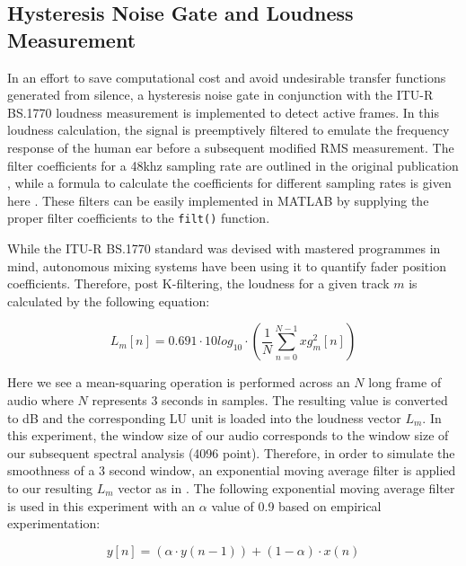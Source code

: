\documentclass{article}
\begin{document}
\subsection{Hysteresis Noise Gate and Loudness Measurement}
\label{subsec:ysteresis Noise Gate and Loudness Measurement}

In an effort to save computational cost and avoid undesirable transfer functions generated from silence, a hysteresis noise gate in conjunction with the ITU-R BS.1770 loudness measurement is implemented to detect active frames.  In this loudness calculation, the signal is preemptively filtered to emulate the frequency response of the human ear before a subsequent modified RMS measurement.  The filter coefficients for a 48khz sampling rate are outlined in the original publication \cite{rec2006bs}, while a formula to calculate the coefficients for different sampling rates is given here \cite{mansbridge2012implementation}.  These filters can be easily implemented in MATLAB by supplying the proper filter coefficients to the \texttt{filt()} function. 

While the ITU-R BS.1770 standard was devised with mastered programmes in mind, autonomous mixing systems have been using it to quantify fader position coefficients.  Therefore, post K-filtering, the loudness for a given track $m$ is calculated by the following equation:

\begin{equation}
\label{eq:ITU-R BS.1770}
L_m[n] = 0.691 \cdot 10log_{10} \cdot \left(\frac{1}{N}\sum_{n=0}^{N-1}xg_m^2[n]\right)
\end{equation}

Here we see a mean-squaring operation is performed across an $N$ long frame of audio where $N$ represents 3 seconds in samples.  The resulting value is converted to dB and the corresponding LU unit is loaded into the loudness vector $L_m$.  In this experiment, the window size of our audio corresponds to the window size of our subsequent spectral analysis (4096 point).  Therefore, in order to simulate the smoothness of a 3 second window, an exponential moving average filter is applied to our resulting $L_m$ vector as in \cite{mansbridge2012implementation}.  The following exponential moving average filter is used in this experiment with an $\alpha$ value of 0.9 based on empirical experimentation:

\begin{equation}
\label{eq:EMAloudness}
y[n] = (\alpha \cdot y(n-1)) + (1-\alpha) \cdot x(n)
\end{equation}
\end{document}
